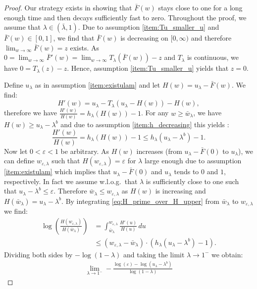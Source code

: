 \documentclass[12pt]{report}
\begin{document}
\begin{proof}
Our strategy exists in showing that $\bar F(w)$ stays close to one for a long enough time and then decays sufficiently fast to zero. Throughout the proof, we assume that $\lambda\in (\bar \lambda, 1)$. 
Due to assumption \ref{item:Tu_smaller_u} and $\bar F(w) \in [0,1]$, 
we find that $\bar F(w)$ is decreasing on $[0,\infty)$
and therefore $\lim_{w \rightarrow \infty} \bar F(w) = z$ exists.
As $0 = \lim_{w \rightarrow \infty} \bar F'(w)= \lim_{w \rightarrow \infty} T_\lambda(
\bar F(w))-z$ and $T_\lambda$ is continuous,  we have $0= T_\lambda(z)-z$. Hence, assumption \ref{item:Tu_smaller_u} yields that $z=0$.

Define $u_\lambda$ as in assumption \ref{item:existulam} and let $H(w)= u_\lambda - \bar F(w)$. We find:
$$
H'(w) = u_\lambda - T_\lambda(u_\lambda - H(w)) - H(w),
$$
therefore we have $\frac{H'(w)}{H(w)} = h_{\lambda}(H(w))-1$. 
For any $w \geq \bar w_{\lambda}$, we have $H(w) \geq u_\lambda - \lambda^b$
and due to assumption \ref{item:h_decreasing} this yields :
\begin{equation}
\frac{H'(w)}{H(w)} = h_{\lambda}(H(w))-1 \leq h_{\lambda}(u_\lambda - \lambda^b) - 1. \label{eq:H_prime_over_H_upper}
\end{equation}
Now let $0 < \varepsilon < 1$ be arbitrary. As $H(w)$ increases (from $u_\lambda-\bar F(0)$ to 
$u_\lambda$), we can define $w_{\varepsilon, \lambda}$ such that $H(w_{\varepsilon, \lambda}) = \varepsilon$ for $\lambda$ large enough due to assumption \ref{item:existulam} which 
implies that $u_\lambda-\bar F(0)$ and $u_\lambda$ tends to $0$ and $1$, respectively. In fact we assume w.l.o.g.~that $\lambda$ is sufficiently close to one such that $u_\lambda-\lambda^b \leq \varepsilon$. Therefore 
$\bar w_{\lambda} \leq w_{\varepsilon, \lambda}$ as $H(w)$ is increasing and
$H(\bar w_\lambda) = u_\lambda - \lambda^b$.
By integrating \eqref{eq:H_prime_over_H_upper} from $\bar w_{\lambda}$ to $w_{\varepsilon,\lambda}$ we find:
\begin{align*}
\log\left( \frac{H(w_{\varepsilon,\lambda})}{H(\bar w_\lambda)} \right)
&=\int_{\bar w_\lambda}^{w_{\varepsilon, \lambda}} \frac{H'(u)}{H(u)} \, du\\
&\leq (w_{\varepsilon,\lambda}- \bar w_{\lambda}) \cdot (h_{\lambda}(u_\lambda - \lambda^b)-1).
\end{align*}
Dividing both sides by $-\log(1-\lambda)$ and taking the limit $\lambda \rightarrow 1^-$ we obtain:
\begin{align*}
\lim_{\lambda \rightarrow 1^-} - \frac{\log(\varepsilon) - \log(u_{\lambda} - \lambda^b)}{\log(1-\lambda)}

\end{align*}
\end{proof}
\end{document}
